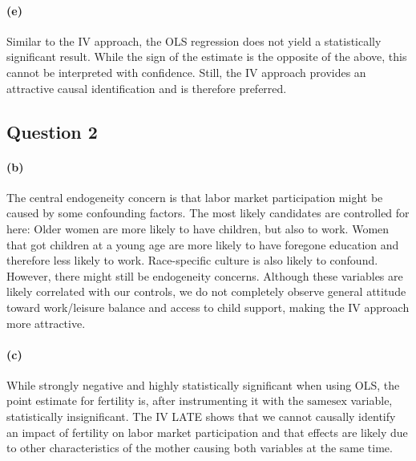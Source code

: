 \documentclass{scrartcl}
\begin{document}
\paragraph*{(e)}

Similar to the IV approach, the OLS regression does not yield a statistically significant result. While the sign of the estimate is the opposite of the above, this cannot be interpreted with confidence. Still, the IV approach provides an attractive causal identification and is therefore preferred.

\subsection*{Question 2}



\paragraph*{(b)}

The central endogeneity concern is that labor market participation might be caused by some confounding factors. The most likely candidates are controlled for here: Older women are more likely to have children, but also to work. Women that got children at a young age are more likely to have foregone education and therefore less likely to work. Race-specific culture is also likely to confound. However, there might still be endogeneity concerns. Although these variables are likely correlated with our controls, we do not completely observe general attitude toward work/leisure balance and access to child support, making the IV approach more attractive.

\paragraph*{(c)}

While strongly negative and highly statistically significant when using OLS, the point estimate for fertility is, after instrumenting it with the $\text{samesex}$ variable, statistically insignificant. The IV LATE shows that we cannot causally identify an impact of fertility on labor market participation and that effects are likely due to other characteristics of the mother causing both variables at the same time.
\end{document}
